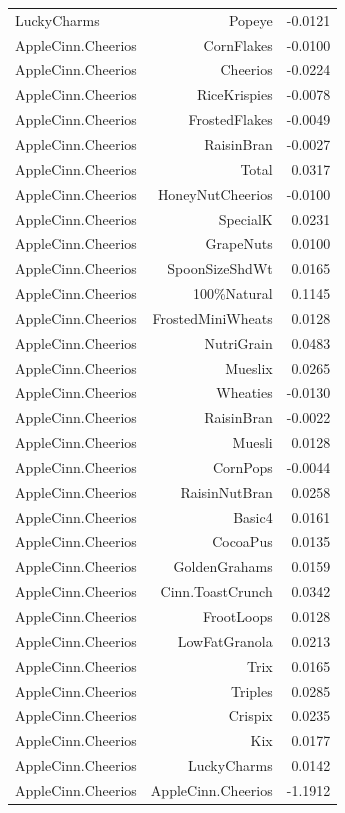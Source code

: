 \begin{longtable}{@{}lrr@{}}
LuckyCharms & Popeye & -0.0121 \\
AppleCinn.Cheerios & CornFlakes & -0.0100 \\
AppleCinn.Cheerios & Cheerios & -0.0224 \\
AppleCinn.Cheerios & RiceKrispies & -0.0078 \\
AppleCinn.Cheerios & FrostedFlakes & -0.0049 \\
AppleCinn.Cheerios & RaisinBran & -0.0027 \\
AppleCinn.Cheerios & Total & 0.0317 \\
AppleCinn.Cheerios & HoneyNutCheerios & -0.0100 \\
AppleCinn.Cheerios & SpecialK & 0.0231 \\
AppleCinn.Cheerios & GrapeNuts & 0.0100 \\
AppleCinn.Cheerios & SpoonSizeShdWt & 0.0165 \\
AppleCinn.Cheerios & 100\%Natural & 0.1145 \\
AppleCinn.Cheerios & FrostedMiniWheats & 0.0128 \\
AppleCinn.Cheerios & NutriGrain & 0.0483 \\
AppleCinn.Cheerios & Mueslix & 0.0265 \\
AppleCinn.Cheerios & Wheaties & -0.0130 \\
AppleCinn.Cheerios & RaisinBran & -0.0022 \\
AppleCinn.Cheerios & Muesli & 0.0128 \\
AppleCinn.Cheerios & CornPops & -0.0044 \\
AppleCinn.Cheerios & RaisinNutBran & 0.0258 \\
AppleCinn.Cheerios & Basic4 & 0.0161 \\
AppleCinn.Cheerios & CocoaPus & 0.0135 \\
AppleCinn.Cheerios & GoldenGrahams & 0.0159 \\
AppleCinn.Cheerios & Cinn.ToastCrunch & 0.0342 \\
AppleCinn.Cheerios & FrootLoops & 0.0128 \\
AppleCinn.Cheerios & LowFatGranola & 0.0213 \\
AppleCinn.Cheerios & Trix & 0.0165 \\
AppleCinn.Cheerios & Triples & 0.0285 \\
AppleCinn.Cheerios & Crispix & 0.0235 \\
AppleCinn.Cheerios & Kix & 0.0177 \\
AppleCinn.Cheerios & LuckyCharms & 0.0142 \\
AppleCinn.Cheerios & AppleCinn.Cheerios & -1.1912 \\

\end{longtable}
